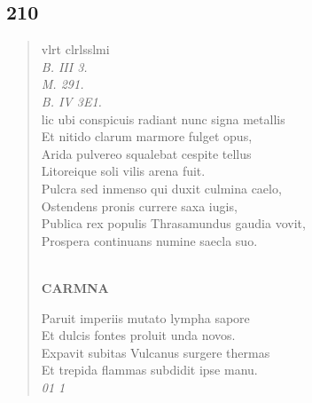 \documentclass[11pt, a4paper]{report}
\begin{document}
            \subsection*{210}
      \begin{verse}
      vlrt clrlsslmi \\ \textit{B. III 3.} \\ \textit{M. 291.} \\ \textit{B. IV 3E1.} \\ lic ubi conspicuis radiant nunc signa metallis \\ Et nitido clarum marmore fulget opus, \\ Arida pulvereo squalebat cespite tellus \\ Litoreique soli vilis arena fuit. \\ Pulcra sed inmenso qui duxit culmina caelo, \\ Ostendens pronis currere saxa iugis, \\ Publica rex populis Thrasamundus gaudia vovit, \\ Prospera continuans numine saecla suo. \\ 
        ﻿\pagebreak 
    \begin{center} \textbf{CARMNA} \end{center} \marginpar{[180]} Paruit imperiis mutato lympha sapore \\ Et dulcis fontes proluit unda novos. \\ Expavit subitas Vulcanus surgere thermas \\ Et trepida flammas subdidit ipse manu. \\ \textit{01 1} \\ 
      \end{verse}
  
\end{document}
